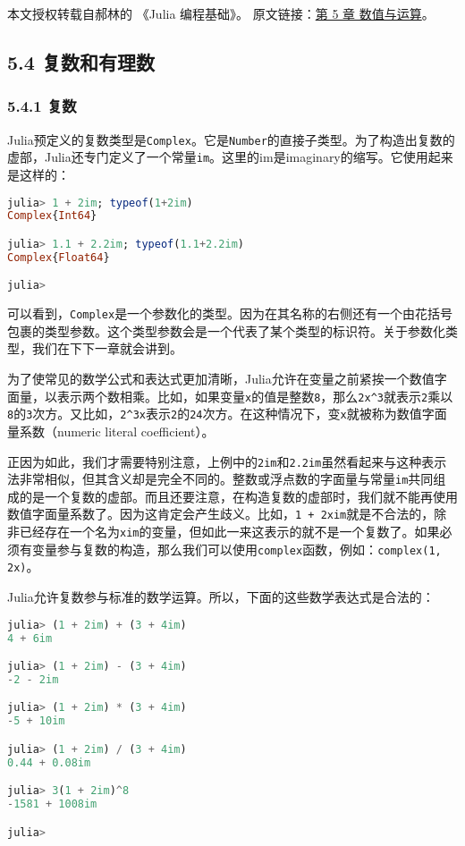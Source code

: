 
本文授权转载自郝林的 《Julia 编程基础》。 原文链接：\href{https://github.com/hyper0x/JuliaBasics/blob/master/book/ch05.md}{第 5 章 数值与运算}。


\subsection{5.4 复数和有理数}

\subsubsection{5.4.1 复数}

Julia预定义的复数类型是\verb|Complex|。它是\verb|Number|的直接子类型。为了构造出复数的虚部，Julia还专门定义了一个常量\verb|im|。这里的im是imaginary的缩写。它使用起来是这样的：
\begin{lstlisting}[language=julia]
julia> 1 + 2im; typeof(1+2im)
Complex{Int64}

julia> 1.1 + 2.2im; typeof(1.1+2.2im)
Complex{Float64}

julia> 
\end{lstlisting}

可以看到，\verb|Complex|是一个参数化的类型。因为在其名称的右侧还有一个由花括号包裹的类型参数。这个类型参数会是一个代表了某个类型的标识符。关于参数化类型，我们在下下一章就会讲到。

为了使常见的数学公式和表达式更加清晰，Julia允许在变量之前紧挨一个数值字面量，以表示两个数相乘。比如，如果变量\verb|x|的值是整数\verb|8|，那么\verb|2x^3|就表示\verb|2|乘以\verb|8|的\verb|3|次方。又比如，\verb|2^3x|表示\verb|2|的\verb|24|次方。在这种情况下，变\verb|x|就被称为数值字面量系数（numeric literal coefficient）。

正因为如此，我们才需要特别注意，上例中的\verb|2im|和\verb|2.2im|虽然看起来与这种表示法非常相似，但其含义却是完全不同的。整数或浮点数的字面量与常量\verb|im|共同组成的是一个复数的虚部。而且还要注意，在构造复数的虚部时，我们就不能再使用数值字面量系数了。因为这肯定会产生歧义。比如，\verb|1 + 2xim|就是不合法的，除非已经存在一个名为\verb|xim|的变量，但如此一来这表示的就不是一个复数了。如果必须有变量参与复数的构造，那么我们可以使用\verb|complex|函数，例如：\verb|complex(1, 2x)|。

Julia允许复数参与标准的数学运算。所以，下面的这些数学表达式是合法的：
\begin{lstlisting}[language=julia]
julia> (1 + 2im) + (3 + 4im)
4 + 6im

julia> (1 + 2im) - (3 + 4im)
-2 - 2im

julia> (1 + 2im) * (3 + 4im)
-5 + 10im

julia> (1 + 2im) / (3 + 4im)
0.44 + 0.08im

julia> 3(1 + 2im)^8
-1581 + 1008im

julia> 
\end{lstlisting}

